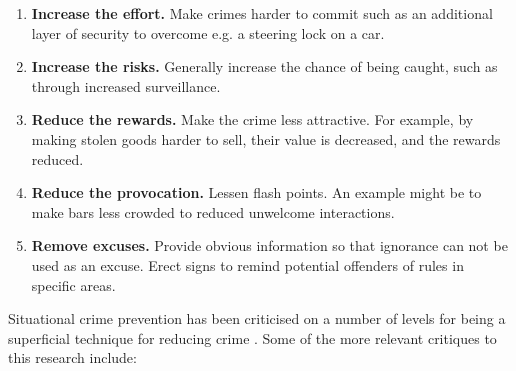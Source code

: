 \begin{enumerate}
\begin{enumerate}
\item{\bf{Increase the effort.}} Make crimes harder to commit such as an additional layer of security to overcome e.g. a steering lock on a car.
\item{\bf{Increase the risks.} }Generally increase the chance of being caught, such as through increased surveillance.
\item{\bf{Reduce the rewards.}} Make the crime less attractive. For example, by making stolen goods harder to sell, their value is decreased, and the rewards reduced.
\item{\bf{Reduce the provocation.}} Lessen flash points. An example might be to make bars less crowded to reduced unwelcome interactions.
\item{\bf{Remove excuses.}} Provide obvious information so that ignorance can not be used as an excuse. Erect signs to remind potential offenders of rules in specific areas. 
\end{enumerate}

\end{enumerate}


Situational crime prevention has been criticised on a number of levels for being a superficial technique for reducing crime \parencite{wortley2010critiques}. Some of the more relevant critiques to this research include:

